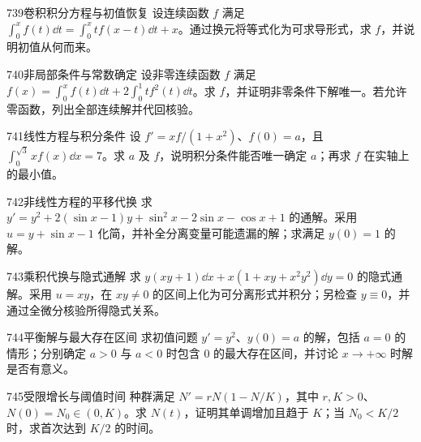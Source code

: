 \begin{exercise}{739}{卷积积分方程与初值恢复}
设连续函数 $f$ 满足 $\int_0^xf(t)\dd t=\int_0^xtf(x-t)\dd t+x$。通过换元将等式化为可求导形式，求 $f$，并说明初值从何而来。
\end{exercise}
\begin{exercise}{740}{非局部条件与常数确定}
设非零连续函数 $f$ 满足 $f(x)=\int_0^xf(t)\dd t+2\int_0^1tf^2(t)\dd t$。求 $f$，并证明非零条件下解唯一。若允许零函数，列出全部连续解并代回核验。
\end{exercise}
\begin{exercise}{741}{线性方程与积分条件}
设 $f'=xf/(1+x^2)$、$f(0)=a$，且 $\int_0^{\sqrt3}xf(x)\dd x=7$。求 $a$ 及 $f$，说明积分条件能否唯一确定 $a$；再求 $f$ 在实轴上的最小值。
\end{exercise}
\begin{exercise}{742}{非线性方程的平移代换}
求 $y'=y^2+2(\sin x-1)y+\sin^2x-2\sin x-\cos x+1$ 的通解。采用 $u=y+\sin x-1$ 化简，并补全分离变量可能遗漏的解；求满足 $y(0)=1$ 的解。
\end{exercise}
\begin{exercise}{743}{乘积代换与隐式通解}
求 $y(xy+1)\dd x+x(1+xy+x^2y^2)\dd y=0$ 的隐式通解。采用 $u=xy$，在 $xy\ne0$ 的区间上化为可分离形式并积分；另检查 $y\equiv0$，并通过全微分核验所得隐式关系。
\end{exercise}
\begin{exercise}{744}{平衡解与最大存在区间}
求初值问题 $y'=y^2$、$y(0)=a$ 的解，包括 $a=0$ 的情形；分别确定 $a>0$ 与 $a<0$ 时包含 $0$ 的最大存在区间，并讨论 $x\to+\infty$ 时解是否有意义。
\end{exercise}
\begin{exercise}{745}{受限增长与阈值时间}
种群满足 $N'=rN(1-N/K)$，其中 $r,K>0$、$N(0)=N_0\in(0,K)$。求 $N(t)$，证明其单调增加且趋于 $K$；当 $N_0<K/2$ 时，求首次达到 $K/2$ 的时间。
\end{exercise}
